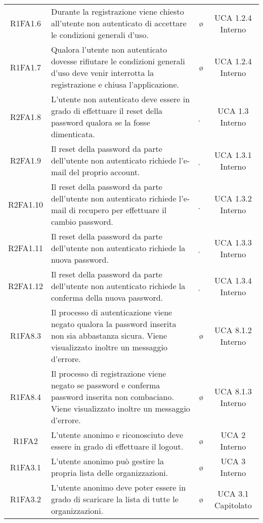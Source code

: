 {\begin{longtable}{ c C{6.5cm} c c}
R1FA1.6 & Durante la registrazione viene chiesto all'utente non autenticato di accettare le condizioni generali d'uso. & \o & UCA 1.2.4 Interno\\

R1FA1.7 & Qualora l'utente non autenticato dovesse rifiutare le condizioni generali d'uso deve venir interrotta la registrazione e chiusa l'applicazione. & \o & UCA 1.2.4 Interno\\

R2FA1.8 & L'utente non autenticato deve essere in grado di effettuare il reset della password qualora se la fosse dimenticata. & \d & UCA 1.3 Interno\\

R2FA1.9 & Il reset della password da parte dell'utente non autenticato richiede l'e-mail del proprio account. & \d & UCA 1.3.1 Interno\\

R2FA1.10 & Il reset della password da parte dell'utente non autenticato richiede l'e-mail di recupero per effettuare il cambio password. & \d & UCA 1.3.2 Interno\\

R2FA1.11 & Il reset della password da parte dell'utente non autenticato richiede la nuova password. & \d & UCA 1.3.3 Interno\\

R2FA1.12 & Il reset della password da parte dell'utente non autenticato richiede la conferma della nuova password. & \d & UCA 1.3.4 Interno\\

R1FA8.3 & Il processo di autenticazione viene negato qualora la password inserita non sia abbastanza sicura. Viene visualizzato inoltre un messaggio d'errore. & \o & UCA 8.1.2 Interno\\

R1FA8.4 & Il processo di registrazione viene negato se password e conferma password inserita non combaciano. Viene visualizzato inoltre un messaggio d'errore. & \o & UCA 8.1.3 Interno\\



R1FA2 & L'utente anonimo e riconosciuto deve essere in grado di effettuare il logout. & \o & UCA 2 Interno\\

R1FA3.1 & L'utente anonimo può gestire la propria lista delle organizzazioni. & \o & UCA 3 Interno\\

R1FA3.2 & L'utente anonimo deve poter essere in grado di scaricare la lista di tutte le organizzazioni. & \o & UCA 3.1 Capitolato \\


\end{longtable}}
